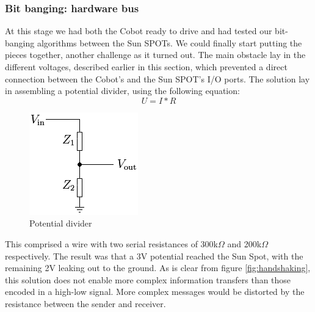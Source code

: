 \documentclass[a4paper,10pt]{article} %
\begin{document}

\subsubsection{Bit banging: hardware bus} %

At this stage we had both the Cobot ready to drive and had tested our
bit-banging algorithms between the Sun SPOTs. We could finally start putting the
pieces together, another challenge as it turned out.  The main obstacle lay in
the different voltages, described earlier in this section, which prevented a
direct connection between the Cobot's and the Sun SPOT's I/O ports. The solution
lay in assembling a potential divider, using the following equation: 
\begin{equation} \label{eq:voltage} U = I*R \end{equation}

\begin{figure}[H]
    \label{fig:voltage_divider}
    \centering
    \includegraphics[scale=1]{img/voltage_divider.png}
    \caption{Potential divider}
\end{figure}

This comprised a wire with two serial resistances of 300k$\Omega$ and
200k$\Omega$ respectively. The result was that a 3V potential reached the Sun
Spot, with the remaining 2V leaking out to the ground. As is clear from figure
\ref{fig:handshaking}, this solution does not enable more complex information
transfers than those encoded in a high-low signal. More complex messages would
be distorted by the resistance between the sender and receiver.
\end{document}
